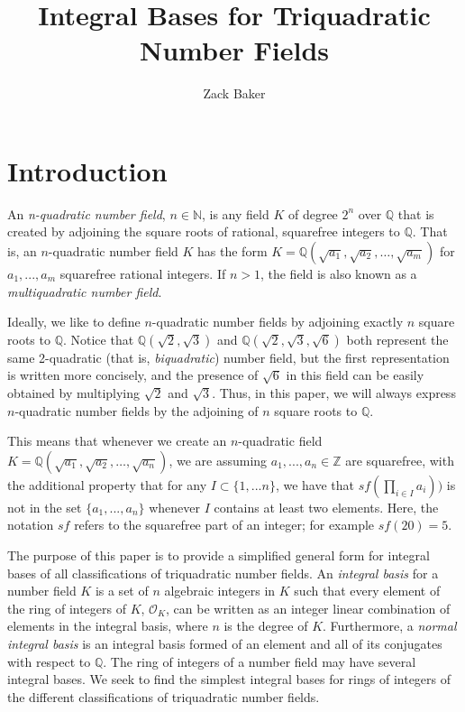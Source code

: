 \documentclass{amsart}
\begin{document}
\title{Integral Bases for Triquadratic Number Fields}
\author{Zack Baker}
\address{Zack Baker,  The King's University, 9125 50 St NW, Edmonton, AB T6B 2H3}

\maketitle

\section{Introduction} 

An \textit{n-quadratic number field}, $n\in\mathbb{N}$, is any field $K$ of degree $2^n$ over $\mathbb{Q}$ that is created by adjoining the square roots of rational, squarefree integers to $\mathbb{Q}$. That is, an $n$-quadratic number field $K$ has the form $K=\mathbb{Q}\left(\sqrt{a_1},\sqrt{a_2},\ldots, \sqrt{a_m}\right)$ for $a_1,...,a_m$ squarefree rational integers.  If $n>1$, the field is also known as a \textit{multiquadratic number field}.

Ideally, we like to define $n$-quadratic number fields by adjoining exactly $n$ square roots to $\mathbb{Q}$. Notice that $\mathbb{Q}\left(\sqrt{2},\sqrt{3}\right)$ and $\mathbb{Q}\left(\sqrt{2},\sqrt{3},\sqrt{6}\right)$ both represent the same 2-quadratic (that is, \textit{biquadratic}) number field, but the first representation is written more concisely, and the presence of $\sqrt{6}$ in this field can be easily obtained by multiplying $\sqrt{2}$ and $\sqrt{3}$. Thus, in this paper, we will always express $n$-quadratic number fields by the adjoining of $n$ square roots to $\mathbb{Q}$. 

This means that whenever we create an $n$-quadratic field $K=\mathbb{Q}\left(\sqrt{a_1},\sqrt{a_2},\ldots, \sqrt{a_n}\right)$, we are assuming $a_1,...,a_n\in\mathbb{Z}$ are squarefree, with the additional property that for any $I\subset\{1,...n\}$, we have that $sf\left(\prod_{i\in I}a_i\right))$ is not in the set $\{a_1,...,a_n\}$ whenever $I$ contains at least two elements. Here, the notation $sf$ refers to the squarefree part of an integer; for example $sf(20)=5$.


The purpose of this paper is to provide a simplified general form for integral bases of all classifications of triquadratic number fields. An \textit{integral basis} for a number field $K$ is a set of $n$ algebraic integers in $K$ such that every element of the ring of integers of $K$, $\mathcal{O}_K$, can be written as an integer linear combination of elements in the integral basis, where $n$ is the degree of $K$. Furthermore, a \textit{normal integral basis} is an integral basis formed of an element and all of its conjugates with respect to $\mathbb{Q}$. The ring of integers of a number field may have several integral bases. We seek to find the simplest integral bases for rings of integers of the different classifications of triquadratic number fields. 
\end{document}
